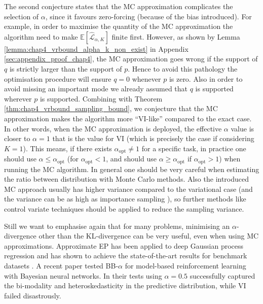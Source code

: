 The second conjecture states that the MC approximation complicates the selection of $\alpha$, since it favours zero-forcing (because of the bias introduced). For example, in order to maximise the quantity of the MC approximation the algorithm need to make $\mathbb{E}[\hat{\mathcal{L}}_{\alpha, K}]$ finite first. However, as shown by Lemma \ref{lemma:chap4_vrbound_alpha_k_non_exist} in Appendix \ref{sec:appendix_proof_chap4}, the MC approximation goes wrong if the support of $q$ is strictly larger than the support of $p$. Hence to avoid this pathology the optimisation procedure will ensure $q = 0$ whenever $p$ is zero. Also in order to avoid missing an important mode we already assumed that $q$ is supported wherever $p$ is supported. Combining with Theorem \ref{thm:chap4_vrbound_sampling_bound}, we conjecture that the MC approximation makes the algorithm more ``VI-like'' compared to the exact case. In other words, when the MC approximation is deployed, the effective $\alpha$ value is closer to $\alpha = 1$ that is the value for VI (which is precisely the case if considering $K = 1$). This means, if there exists $\alpha_{\text{opt}} \neq 1$ for a specific task, in practice one should use $\alpha \leq \alpha_{\text{opt}}$ (for $\alpha_{\text{opt}} < 1$, and should use $\alpha \geq \alpha_{\text{opt}}$ if $\alpha_{\text{opt}} > 1$) when running the MC algorithm. In general one should be very careful when estimating the ratio between distribution with Monte Carlo methods. Also the introduced MC approach usually has higher variance compared to the variational case (and the variance can be as high as importance sampling \citep{bamler:perturbative_bbvi2017}), so further methods like control variate techniques should be applied to reduce the sampling variance.

Still we want to emphasise again that for many problems, minimising an $\alpha$-divergence other than the KL-divergence can be very useful, even when using MC approximations. Approximate EP has been applied to deep Gaussian process regression and has shown to achieve the state-of-the-art results for benchmark datasets \citep{bui:dgp2016}. A recent paper \citep{depeweg:bnn_rl2016} tested BB-$\alpha$ for model-based reinforcement learning with Bayesian neural networks. In their tests using $\alpha = 0.5$ successfully captured the bi-modality and heteroskedasticity in the predictive distribution, while VI failed disastrously.